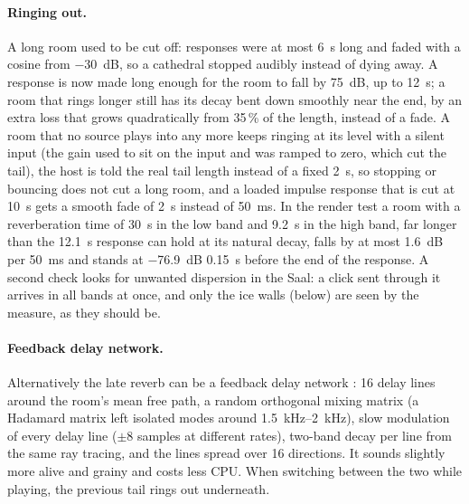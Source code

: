 \documentclass[11pt,a4paper,parskip=half,DIV=11,toc=bibliography]{scrartcl}
\begin{document}
\paragraph{Ringing out.} A long room used to be cut off: responses were at most \SI{6}{s} long and faded with a cosine from \SI{-30}{dB}, so a
cathedral stopped audibly instead of dying away. A response is now made long enough for the room to fall by \SI{75}{dB}, up to \SI{12}{s}; a
room that rings longer still has its decay bent down smoothly near the end, by an extra loss that grows quadratically from 35\,\% of the length, instead
of a fade. A room that no source plays into any more keeps ringing at its level with a silent input (the gain used to sit on the input and was ramped
to zero, which cut the tail), the host is told the real tail length instead of a fixed \SI{2}{s}, so stopping or bouncing does not cut a long room, and
a loaded impulse response that is cut at \SI{10}{s} gets a smooth fade of \SI{2}{s} instead of \SI{50}{ms}. In the render test a room with a reverberation time of \SI{30}{s} in the low band
and \SI{9.2}{s} in the high band, far longer than the \SI{12.1}{s} response can hold at its natural decay, falls by at most \SI{1.6}{dB} per \SI{50}{ms} and stands at \SI{-76.9}{dB} \SI{0.15}{s} before the
end of the response. A second check looks for unwanted dispersion in the Saal: a click sent through it arrives in all bands at once, and only the
ice walls (below) are seen by the measure, as they should be.

\paragraph{Feedback delay network.} Alternatively the late reverb can be a feedback delay network
\citep{jot1991fdn}: 16 delay lines around the room's mean free path, a random orthogonal mixing matrix
(a Hadamard matrix left isolated modes around \SIrange{1.5}{2}{kHz}), slow modulation of every delay line
($\pm8$ samples at different rates), two-band decay per line from the same ray tracing, and the lines spread
over 16 directions. It sounds slightly more alive and grainy and costs less CPU. When switching between the
two while playing, the previous tail rings out underneath.
\end{document}
